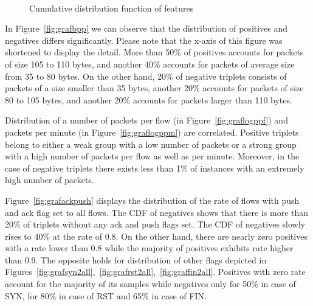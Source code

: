 \documentclass[preprint,12pt,3p]{elsarticle}
\begin{document}
\begin{figure}
    \qquad
    \\
    \caption{Cumulative distribution function of features}%
    \label{fig:histograms}%
\end{figure}

In Figure~\ref{fig:grafbpp} we can observe that the distribution of positives and negatives differs significantly.
Please note that the x-axis of this figure was shortened to display the detail.
More than 50\% of positives accounts for packets of size 105 to 110 bytes, and another 40\% accounts for packets of average size from 35 to 80 bytes. 
On the other hand, 20\% of negative triplets consists of packets of a size smaller than 35 bytes, another 20\% accounts for packets of size 80 to 105 bytes, and another 20\% accounts for packets larger than 110 bytes.

Distribution of a number of packets per flow (in Figure~\ref{fig:graflogppf}) and packets per minute (in Figure~\ref{fig:graflogppm}) are correlated. 
Positive triplets belong to either a weak group with a low number of packets or a strong group with a high number of packets per flow as well as per minute.
Moreover, in the case of negative triplets there exists less than 1\% of instances with an extremely high number of packets.

Figure~\ref{fig:grafackpush} displays the distribution of the rate of flows with push and ack flag set to all flows.
The CDF of negatives shows that there is more than 20\% of triplets without any ack and push flags set. 
The CDF of negatives slowly rises to 40\% at the rate of 0.8. 
On the other hand, there are nearly zero positives with a rate lower than 0.8 while the majority of positives exhibits rate higher than 0.9.
The opposite holds for distribution of other flags depicted in Figures~\ref{fig:grafsyn2all},~\ref{fig:grafrst2all},~\ref{fig:graffin2all}. 
Positives with zero rate account for the majority of its samples while negatives only for 50\% in case of SYN, for 80\% in case of RST and 65\% in case of FIN.
\end{document}
